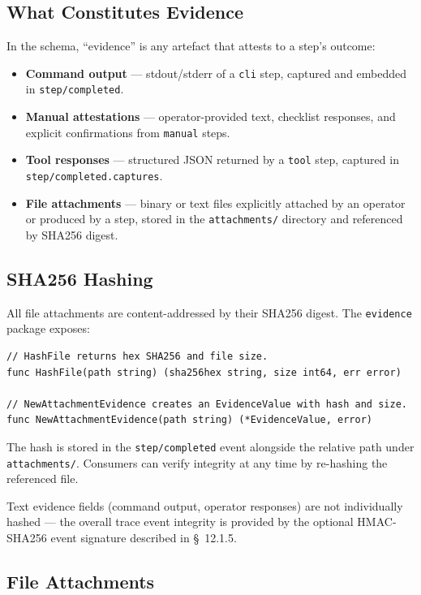 \subsection{What Constitutes Evidence}

In the schema, ``evidence'' is any artefact that attests to a step's outcome:

\begin{itemize}
  \item \textbf{Command output} — stdout/stderr of a \texttt{cli} step, captured and embedded in \texttt{step/completed}.
  \item \textbf{Manual attestations} — operator-provided text, checklist responses, and explicit confirmations from \texttt{manual} steps.
  \item \textbf{Tool responses} — structured JSON returned by a \texttt{tool} step, captured in \texttt{step/completed.captures}.
  \item \textbf{File attachments} — binary or text files explicitly attached by an operator or produced by a step, stored in the \texttt{attachments/} directory and referenced by SHA256 digest.
\end{itemize}

\subsection{SHA256 Hashing}

All file attachments are content-addressed by their SHA256 digest. The \texttt{evidence} package exposes:

\begin{verbatim}
// HashFile returns hex SHA256 and file size.
func HashFile(path string) (sha256hex string, size int64, err error)

// NewAttachmentEvidence creates an EvidenceValue with hash and size.
func NewAttachmentEvidence(path string) (*EvidenceValue, error)
\end{verbatim}

The hash is stored in the \texttt{step/completed} event alongside the relative path under \texttt{attachments/}. Consumers can verify integrity at any time by re-hashing the referenced file.

Text evidence fields (command output, operator responses) are not individually hashed — the overall trace event integrity is provided by the optional HMAC-SHA256 event signature described in \S~12.1.5.

\subsection{File Attachments}

